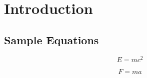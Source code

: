 \documentclass{report}
\begin{document}
	
	\tableofcontents
	\listofmyequations %
	
	\chapter{Introduction}
	\section{Sample Equations}
	
	\begin{equation}
		E = mc^2
	\end{equation}
	
	\begin{equation}
		F = ma
	\end{equation}
	
\end{document}
